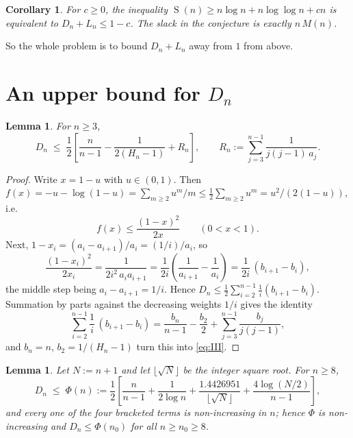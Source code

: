 \documentclass[11pt]{amsart}
\newtheorem{lemma}[theorem]{Lemma}
\newtheorem{corollary}[theorem]{Corollary}
\DeclareMathOperator{\Sfun}{S}
\newcommand{\Hn}{H}
\begin{document}
\begin{corollary}\label{cor:equiv}
For $c\ge0$, the inequality $\Sfun(n)\ge n\log n+n\log\log n+cn$ is \emph{equivalent} to
$D_n+L_n\le1-c$. The slack in the conjecture is exactly $n\,M(n)$.
\end{corollary}

So the whole problem is to bound $D_n+L_n$ away from $1$ from above.

\section{An upper bound for $D_n$}

\begin{lemma}\label{lem:III}
For $n\ge3$,
\begin{equation}\label{eq:III}
 D_n\;\le\;\frac12\left[\frac{n}{n-1}-\frac1{2(\Hn_n-1)}+R_n\right],
 \qquad
 R_n:=\sum_{j=3}^{n-1}\frac1{j(j-1)\,a_j}.
\end{equation}
\end{lemma}

\begin{proof}
Write $x=1-u$ with $u\in(0,1)$. Then
$f(x)=-u-\log(1-u)=\sum_{m\ge2}u^m/m\le\tfrac12\sum_{m\ge2}u^m=u^2/(2(1-u))$, i.e.
\begin{equation}\label{eq:fbound}
 f(x)\le\frac{(1-x)^2}{2x}\qquad(0<x<1).
\end{equation}
Next, $1-x_i=(a_i-a_{i+1})/a_i=(1/i)/a_i$, so
\[
 \frac{(1-x_i)^2}{2x_i}
 =\frac{1}{2i^2\,a_ia_{i+1}}
 =\frac1{2i}\left(\frac1{a_{i+1}}-\frac1{a_i}\right)
 =\frac1{2i}\,(b_{i+1}-b_i),
\]
the middle step being $a_i-a_{i+1}=1/i$. Hence
$D_n\le\tfrac12\sum_{i=2}^{n-1}\tfrac1i(b_{i+1}-b_i)$. Summation by parts against the
decreasing weights $1/i$ gives the identity
\[
 \sum_{i=2}^{n-1}\frac1i\,(b_{i+1}-b_i)
 =\frac{b_n}{n-1}-\frac{b_2}{2}+\sum_{j=3}^{n-1}\frac{b_j}{j(j-1)} ,
\]
and $b_n=n$, $b_2=1/(\Hn_n-1)$ turn this into \eqref{eq:III}.
\end{proof}

\begin{lemma}\label{lem:IV}
Let $N:=n+1$ and let $\lfloor\sqrt N\rfloor$ be the integer square root. For $n\ge8$,
\begin{equation}\label{eq:IV}
 D_n\;\le\;\Phi(n):=\frac12\left[\frac{n}{n-1}+\frac1{2\log n}
 +\frac{1.4426951}{\lfloor\sqrt N\rfloor}
 +\frac{4\log(N/2)}{n-1}\right],
\end{equation}
and every one of the four bracketed terms is non-increasing in $n$; hence $\Phi$ is
non-increasing and $D_n\le\Phi(n_0)$ for all $n\ge n_0\ge8$.
\end{lemma}
\end{document}
